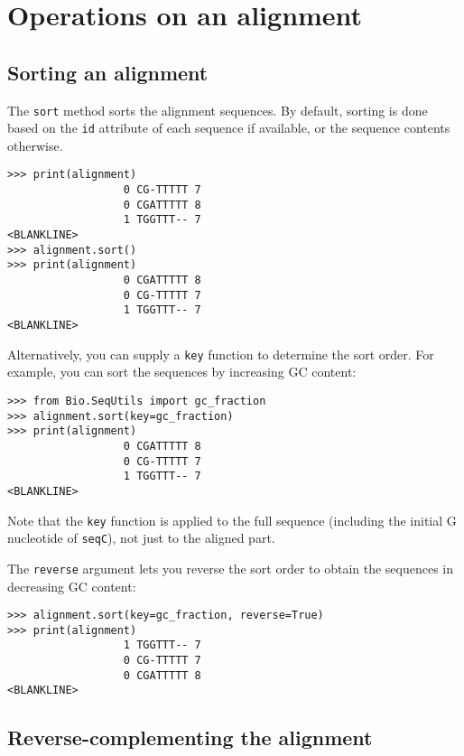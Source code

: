 \section{Operations on an alignment}

\subsection{Sorting an alignment}

The \verb+sort+ method sorts the alignment sequences. By default, sorting is done based on the \verb+id+ attribute of each sequence if available, or the sequence contents otherwise.
\begin{verbatim}
>>> print(alignment)
                  0 CG-TTTTT 7
                  0 CGATTTTT 8
                  1 TGGTTT-- 7
<BLANKLINE>
>>> alignment.sort()
>>> print(alignment)
                  0 CGATTTTT 8
                  0 CG-TTTTT 7
                  1 TGGTTT-- 7
<BLANKLINE>
\end{verbatim}
Alternatively, you can supply a \verb+key+ function to determine the sort order. For example, you can sort the sequences by increasing GC content:
\begin{verbatim}
>>> from Bio.SeqUtils import gc_fraction
>>> alignment.sort(key=gc_fraction)
>>> print(alignment)
                  0 CGATTTTT 8
                  0 CG-TTTTT 7
                  1 TGGTTT-- 7
<BLANKLINE>
\end{verbatim}
Note that the \verb+key+ function is applied to the full sequence (including the initial G nucleotide of \verb|seqC|), not just to the aligned part.

The \verb+reverse+ argument lets you reverse the sort order to obtain the sequences in decreasing GC content:
\begin{verbatim}
>>> alignment.sort(key=gc_fraction, reverse=True)
>>> print(alignment)
                  1 TGGTTT-- 7
                  0 CG-TTTTT 7
                  0 CGATTTTT 8
<BLANKLINE>
\end{verbatim}

\subsection{Reverse-complementing the alignment}

